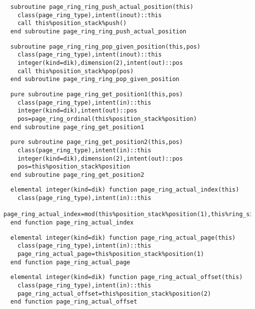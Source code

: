 \begin{Verbatim}
  subroutine page_ring_ring_push_actual_position(this)
    class(page_ring_type),intent(inout)::this
    call this%position_stack%push()
  end subroutine page_ring_ring_push_actual_position
\end{Verbatim}

\begin{Verbatim}
  subroutine page_ring_ring_pop_given_position(this,pos)
    class(page_ring_type),intent(inout)::this
    integer(kind=dik),dimension(2),intent(out)::pos
    call this%position_stack%pop(pos)
  end subroutine page_ring_ring_pop_given_position
\end{Verbatim}

\begin{Verbatim}
  pure subroutine page_ring_get_position1(this,pos)
    class(page_ring_type),intent(in)::this
    integer(kind=dik),intent(out)::pos
    pos=page_ring_ordinal(this%position_stack%position)
  end subroutine page_ring_get_position1
\end{Verbatim}

\begin{Verbatim}
  pure subroutine page_ring_get_position2(this,pos)
    class(page_ring_type),intent(in)::this
    integer(kind=dik),dimension(2),intent(out)::pos
    pos=this%position_stack%position
  end subroutine page_ring_get_position2
\end{Verbatim}

\begin{Verbatim}
  elemental integer(kind=dik) function page_ring_actual_index(this)
    class(page_ring_type),intent(in)::this
    page_ring_actual_index=mod(this%position_stack%position(1),this%ring_size)
  end function page_ring_actual_index
\end{Verbatim}

\begin{Verbatim}
  elemental integer(kind=dik) function page_ring_actual_page(this)
    class(page_ring_type),intent(in)::this
    page_ring_actual_page=this%position_stack%position(1)
  end function page_ring_actual_page
\end{Verbatim}

\begin{Verbatim}
  elemental integer(kind=dik) function page_ring_actual_offset(this)
    class(page_ring_type),intent(in)::this
    page_ring_actual_offset=this%position_stack%position(2)
  end function page_ring_actual_offset
\end{Verbatim}

